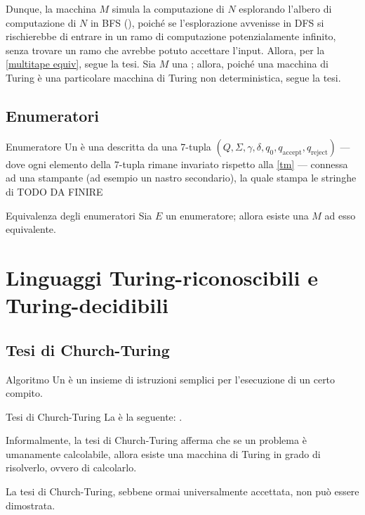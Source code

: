 \documentclass[a4paper, 12pt]{report}
\begin{document}
{        Dunque, la macchina $M$ simula la computazione di $N$ esplorando l'albero di computazione di $N$ in BFS (), poiché se l'esplorazione avvenisse in DFS si rischierebbe di entrare in un ramo di computazione potenzialamente infinito, senza trovare un ramo che avrebbe potuto accettare l'input. Allora, per la \cref{multitape equiv}, segue la tesi.
    }{
        Sia $M$ una \TM; allora, poiché una macchina di Turing è una particolare macchina di Turing non deterministica, segue la tesi.
    }

    \subsection{Enumeratori}

    \begin{frameddefn}{Enumeratore}
        Un  è una \TM descritta da una 7-tupla $(Q, \Sigma, \gamma, \delta, q_0, q_\mathrm{accept}, q_\mathrm{reject})$ --- dove ogni elemento della 7-tupla rimane invariato rispetto alla \cref{tm} --- connessa ad una stampante (ad esempio un nastro secondario), la quale stampa le stringhe di TODO DA FINIRE
    \end{frameddefn}

    \begin{framedprop}{Equivalenza degli enumeratori}
        Sia $E$ un enumeratore; allora esiste una \TM $M$ ad esso equivalente.
    \end{framedprop}

  
    \section{Linguaggi Turing-riconoscibili e Turing-decidibili}

    \subsection{Tesi di Church-Turing}

    \begin{frameddefn}{Algoritmo}
        Un  è un insieme di istruzioni semplici per l'esecuzione di un certo compito.
    \end{frameddefn}

    \begin{frameddefn}{Tesi di Church-Turing}
        La  è la seguente: .

        Informalmente, la tesi di Church-Turing afferma che se un problema è umanamente calcolabile, allora esiste una macchina di Turing in grado di risolverlo, ovvero di calcolarlo.

        La tesi di Church-Turing, sebbene ormai universalmente accettata, non può essere dimostrata.
    \end{frameddefn}
\end{document}
